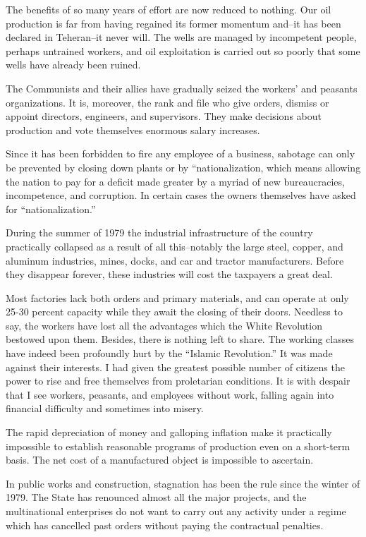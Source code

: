 The benefits of so many years of effort are now reduced to nothing. Our oil production is far from having regained its former momentum and--it has been declared in Teheran--it never will. The wells are managed by incompetent people, perhaps untrained workers, and oil exploitation is carried out so poorly that some wells have already been ruined. 

The Communists and their allies have gradually seized the workers’ and peasants organizations. It is, moreover, the rank and file who give orders, dismiss or appoint directors, engineers, and supervisors. They make decisions about production and vote themselves enormous salary increases. 

Since it has been forbidden to fire any employee of a business, sabotage can only be prevented by closing down plants or by “nationalization, which means allowing the nation to pay for a deficit made greater by a myriad of new bureaucracies, incompetence, and corruption. In certain cases the owners themselves have asked for “nationalization.” 

During the summer of 1979 the industrial infrastructure of the country practically collapsed as a result of all this--notably the large steel, copper, and aluminum industries, mines, docks, and car and tractor manufacturers. Before they disappear forever, these industries will cost the taxpayers a great deal. 

Most factories lack both orders and primary materials, and can operate at only 25-30 percent capacity while they await the closing of their doors. Needless to say, the workers have lost all the advantages which the White Revolution bestowed upon them. Besides, there is nothing left to share. The working classes have indeed been profoundly hurt by the “Islamic Revolution.” It was made against their interests. I had given the greatest possible number of citizens the power to rise and free themselves from proletarian conditions. It is with despair that I see workers, peasants, and employees without work, falling again into financial difficulty and sometimes into misery. 

The rapid depreciation of money and galloping inflation make it practically impossible to establish reasonable programs of production even on a short-term basis. The net cost of a manufactured object is impossible to ascertain. 

In public works and construction, stagnation has been the rule since the winter of 1979. The State has renounced almost all the major projects, and the multinational enterprises do not want to carry out any activity under a regime which has cancelled past orders without paying the contractual penalties. 

